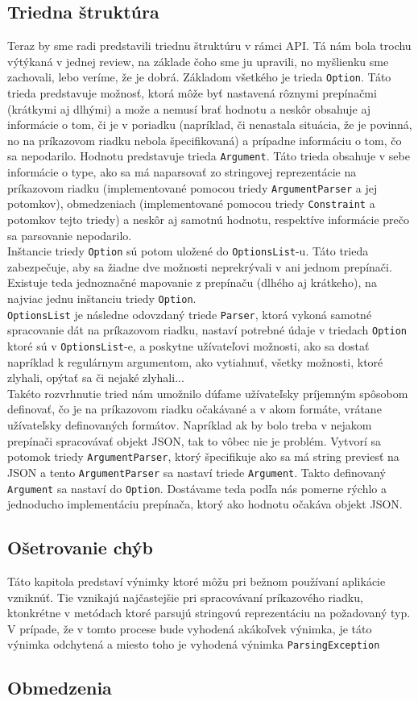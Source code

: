 \documentclass{article}
\begin{document}
\subsection{Triedna štruktúra}
Teraz by sme radi predstavili triednu štruktúru v rámci API. Tá nám bola trochu výtýkaná v jednej review, na základe čoho sme ju upravili, no myšlienku sme zachovali, lebo veríme, že je dobrá. Základom všetkého je trieda \texttt{Option}. Táto trieda predstavuje možnosť, ktorá môže byť nastavená rôznymi prepínačmi (krátkymi aj dlhými) a može a nemusí brať hodnotu a neskôr obsahuje aj informácie o tom, či je v poriadku (napríklad, či nenastala situácia, že je povinná, no na príkazovom riadku nebola špecifikovaná) a prípadne informáciu o tom, čo sa nepodarilo. Hodnotu predstavuje trieda \texttt{Argument}. Táto trieda obsahuje v sebe informácie o type, ako sa má naparsovať zo stringovej reprezentácie na príkazovom riadku (implementované pomocou triedy \texttt{ArgumentParser} a jej potomkov), obmedzeniach (implementované pomocou triedy \texttt{Constraint} a potomkov tejto triedy) a neskôr aj samotnú hodnotu, respektíve informácie prečo sa parsovanie nepodarilo.\\
Inštancie triedy \texttt{Option} sú potom uložené do \texttt{OptionsList}-u. Táto trieda zabezpečuje, aby sa žiadne dve možnosti neprekrývali v ani jednom prepínači. Existuje teda jednoznačné mapovanie z prepínaču (dlhého aj krátkeho), na najviac jednu inštanciu triedy \texttt{Option}.\\
\texttt{OptionsList} je následne odovzdaný triede \texttt{Parser}, ktorá vykoná samotné spracovanie dát na príkazovom riadku, nastaví potrebné údaje v triedach \texttt{Option} ktoré sú v \texttt{OptionsList}-e, a poskytne užívateľovi možnosti, ako sa dostať napríklad k regulárnym argumentom, ako vytiahnuť, všetky možnosti, ktoré zlyhali, opýtať sa či nejaké zlyhali...\\
Takéto rozvrhnutie tried nám umožnilo dúfame užívateľsky príjemným spôsobom definovať, čo je na príkazovom riadku očakávané a v akom formáte, vrátane užívateľsky definovaných formátov. Napríklad ak by bolo treba v nejakom prepínači spracovávať objekt JSON, tak to vôbec nie je problém. Vytvorí sa potomok triedy \texttt{ArgumentParser}, ktorý špecifikuje ako sa má string previesť na JSON a tento \texttt{ArgumentParser} sa nastaví triede \texttt{Argument}. Takto definovaný \texttt{Argument} sa nastaví do \texttt{Option}. Dostávame teda podľa nás pomerne rýchlo a jednoducho implementáciu prepínača, ktorý ako hodnotu očakáva objekt JSON.
\subsection{Ošetrovanie chýb}
Táto kapitola predstaví výnimky ktoré môžu pri bežnom používaní aplikácie vzniknúť. Tie vznikajú najčastejšie pri spracovávaní príkazového riadku, ktonkrétne v metódach ktoré parsujú stringovú reprezentáciu na požadovaný typ. V prípade, že v tomto procese bude vyhodená akákoľvek výnimka, je táto výnimka odchytená a miesto toho je vyhodená výnimka \texttt{ParsingException}
\subsection{Obmedzenia}
\end{document}
